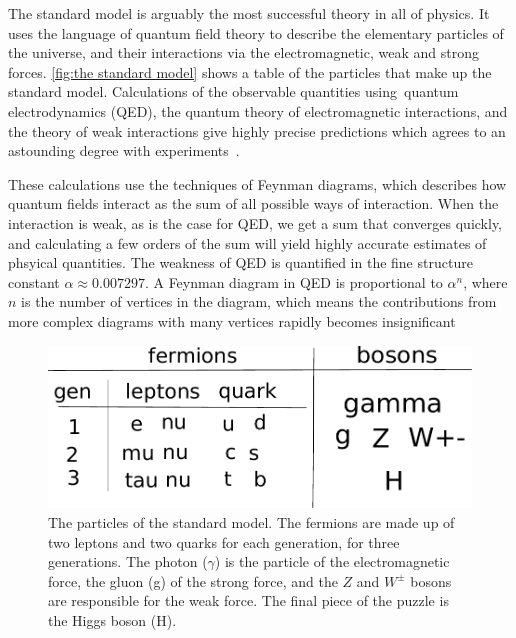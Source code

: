 




The standard model is arguably the most successful theory in all of physics.
It uses the language of quantum field theory to describe the elementary particles of the universe, and their interactions via the electromagnetic, weak and strong forces.
\autoref{fig:the standard model} shows a table of the particles that make up the standard model.
Calculations of the observable quantities using quantum electrodynamics (QED), the quantum theory of electromagnetic interactions, and the theory of weak interactions give highly precise predictions which agrees to an astounding degree with experiments~\cite{Schwartz:QFT}.

These calculations use the techniques of Feynman diagrams, which describes how quantum fields interact as the sum of all possible ways of interaction.
When the interaction is weak, as is the case for QED, we get a sum that converges quickly, and calculating a few orders of the sum will yield highly accurate estimates of phsyical quantities.
The weakness of QED is quantified in the fine structure constant $\alpha \approx 0.00 7297$\cite{PDG}.
A Feynman diagram in QED is proportional to $\alpha^n$, where $n$ is the number of vertices in the diagram, which means the contributions from more complex diagrams with many vertices rapidly becomes insignificant

\begin{figure}
    \centering
    \includegraphics[]{figurer/standard_model.pdf}
    \caption{The particles of the standard model. The fermions are made up of two leptons and two quarks for each generation, for three generations. The photon ($\gamma$) is the particle of the electromagnetic force, the gluon (g) of the strong force, and the $Z$ and $W^\pm$ bosons are responsible for the weak force. The final piece of the puzzle is the Higgs boson (H).}
    \label{fig:the standard model}
\end{figure}

